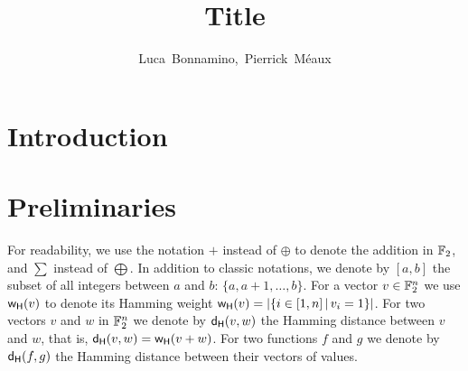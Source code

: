 \documentclass[11pt]{llncs}
\begin{document}
	
\setcounter{page}{1}
	\title{Title}

	
	
	
	\author{
		\mbox{Luca Bonnamino, Pierrick M\'eaux}%
	}
	
	
	
	
	
	
	\maketitle


	
	\begin{abstract}

		
		
	\end{abstract}



\section{Introduction}





\section{Preliminaries}\label{sec:prelim}


For readability, we use the notation $+$ instead of 
$\oplus$ to denote the addition in $\mathbb{F}_2$, and $\sum$ instead of $\bigoplus$. 
In addition to classic notations, we denote by $ [a,b] $ the subset of all integers between $a$ and $b$: $\{a, a+1, \ldots,b\}$. 
For a vector $v\in \mathbb{F}_2^n$ we use $\mathsf{w_H}(v)$ to denote its Hamming weight $\mathsf{w_H}(v)=|\{ i \in [1,n] \, | \, v_i=1 \}|$. 
For two vectors $v$ and $w$ in $\mathbb{F}_2^n$ we denote by $\mathsf{d_H}(v,w)$ the Hamming distance between $v$ and $w$, that is, $\mathsf{d_H}(v,w)=\mathsf{w_H}(v+w)$. 
For two functions $f$ and $g$ we denote by $\mathsf{d_H}(f,g)$ the Hamming distance between their vectors of values.
\end{document}
